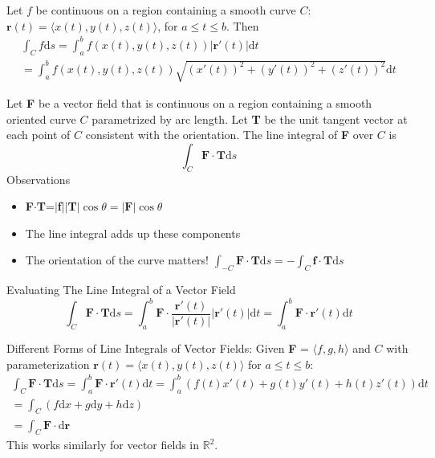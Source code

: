 \documentclass[../calc3.tex]{subfiles}
\begin{document}
\begin{theorem}
    Let $f$ be continuous on a region containing a smooth curve $C$: $\textbf{r}(t)=\langle x(t),y(t),z(t)\rangle$, for $a\leq t\leq b$. Then 
    \begin{align*}
        \int_C f\mathrm{d}s = \int_a^b f(x(t),y(t),z(t))|\textbf{r}'(t)|\mathrm{d}t \\
        =\int_a^b f(x(t),y(t),z(t))\sqrt{(x'(t))^2+(y'(t))^2+(z'(t))^2}\mathrm{d}t
    \end{align*}
\end{theorem}

\begin{definition}
    Let \textbf{F} be a vector field that is continuous on a region containing a smooth oriented curve 
    $C$ parametrized by arc length. Let \textbf{T} be the unit tangent vector at each point of $C$ 
    consistent with the orientation. The line integral of \textbf{F} over $C$ is 
    \[\int_C \textbf{F}\cdot\textbf{T}\mathrm{d}s\]
    Observations
    \begin{itemize}
        \item \textbf{F}$\cdot$\textbf{T}=$|$\textbf{f}$|$$|$\textbf{T}$|$$\cos\theta = |\textbf{F}|\cos\theta$ 
        \item The line integral adds up these components 
        \item The orientation of the curve matters! $\int_{-C}\textbf{F}\cdot\textbf{T}\mathrm{d}s = -\int_C \textbf{f}\cdot\textbf{T}\mathrm{d}s$
    \end{itemize}
\end{definition}

Evaluating The Line Integral of a Vector Field 
\[\int_C \textbf{F}\cdot\textbf{T}\mathrm{d}s = \int_a^b \textbf{F}\cdot \frac{\textbf{r}'(t)}{|\textbf{r}'(t)|}|\textbf{r}'(t)|\mathrm{d}t = \int_a^b \textbf{F}\cdot\textbf{r}'(t)\mathrm{d}t\]

Different Forms of Line Integrals of Vector Fields: Given \textbf{F} = $\langle f,g,h \rangle$ and $C$ with parameterization $\textbf{r}(t) = \langle x(t), y(t), z(t)\rangle$ for $a \leq t \leq b$:
\begin{align*}
    \int_C \textbf{F}\cdot \textbf{T}\mathrm{d}s = \int_a^b \textbf{F}\cdot\textbf{r}'(t)\mathrm{d}t = \int_a^b (f(t)x'(t)+g(t)y'(t)+h(t)z'(t))\mathrm{d}t\\
    =\int_C (f\mathrm{d}x+g\mathrm{d}y+h\mathrm{d}z)\\
    =\int_C \textbf{F}\cdot\mathrm{d}\textbf{r}
\end{align*}
This works similarly for vector fields in $\mathbb{R}^2$.
\end{document}
